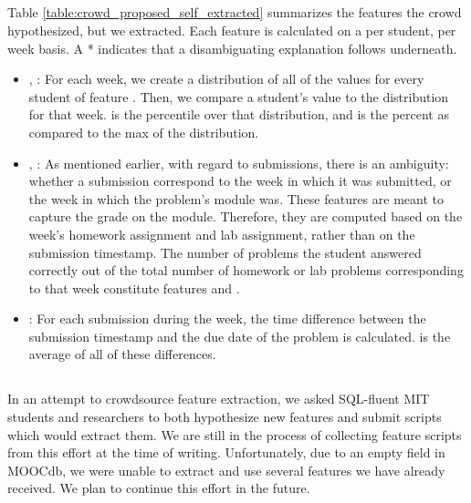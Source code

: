 \subsection{\crowdself}\label{section:crowdself}
Table \ref{table:crowd_proposed_self_extracted} summarizes the features the crowd hypothesized, but we extracted. Each feature is calculated on a per student, per week basis. A * indicates that a disambiguating explanation follows underneath.



\begin{itemize}

\item {}, : For each week, we create a distribution of all of the values for every student of feature . Then, we compare a student's  value to the distribution for that week.  is the percentile over that distribution, and  is the percent as compared to the max of the distribution.

\item {}, : As mentioned earlier, with regard to submissions, there is an ambiguity: whether a submission correspond to the week in which it was submitted, or the week in which the problem's module was. These features are meant to capture the grade on the module. Therefore, they are computed based on the week's homework assignment and lab assignment, rather than on the submission timestamp. The number of problems the student answered correctly out of the total number of homework or lab problems corresponding to that week constitute features  and .

\item {}: For each submission during the week, the time difference between the submission timestamp and the due date of the problem is calculated.  is the average of all of these differences. 

\end{itemize}

\subsection{\crowdcrowd}

In an attempt to crowdsource feature extraction, we asked SQL-fluent MIT students and researchers to both hypothesize new features and submit scripts which would extract them. We are still in the process of collecting feature scripts from this effort at the time of writing. Unfortunately, due to an empty field in MOOCdb, we were unable to extract and use several features we have already received. We plan to continue this effort in the future.


